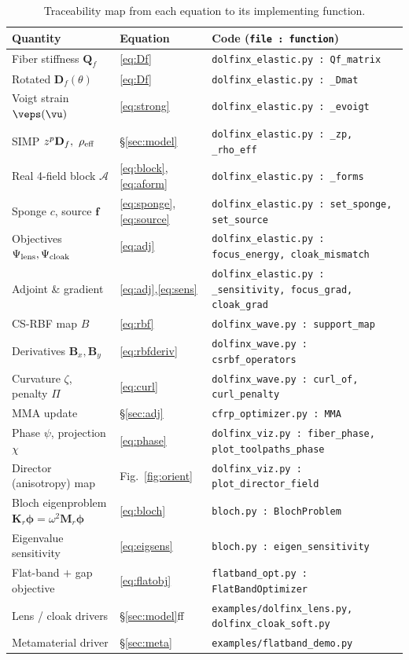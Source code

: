 \documentclass[11pt]{article}
\begin{document}
\begin{table}[h]
\centering
\small
\begin{tabular}{@{}lll@{}}
\toprule
Quantity & Equation & Code (\texttt{file : function}) \\
\midrule
Fiber stiffness $\mathbf Q_f$ & \eqref{eq:Df} & \texttt{dolfinx\_elastic.py : Qf\_matrix} \\
Rotated $\mathbf D_f(\theta)$ & \eqref{eq:Df} & \texttt{dolfinx\_elastic.py : \_Dmat} \\
Voigt strain $\veps(\vu)$ & \eqref{eq:strong} & \texttt{dolfinx\_elastic.py : \_evoigt} \\
SIMP $z^p\mathbf D_f,\ \rho_{\rm eff}$ & \S\ref{sec:model} & \texttt{dolfinx\_elastic.py : \_zp, \_rho\_eff} \\
Real 4-field block $\mathcal A$ & \eqref{eq:block},\eqref{eq:aform} & \texttt{dolfinx\_elastic.py : \_forms} \\
Sponge $c$, source $\mathbf f$ & \eqref{eq:sponge},\eqref{eq:source} & \texttt{dolfinx\_elastic.py : set\_sponge, set\_source} \\
Objectives $\Psi_{\rm lens},\Psi_{\rm cloak}$ & \eqref{eq:adj} & \texttt{dolfinx\_elastic.py : focus\_energy, cloak\_mismatch} \\
Adjoint \& gradient & \eqref{eq:adj},\eqref{eq:sens} & \texttt{dolfinx\_elastic.py : \_sensitivity, focus\_grad, cloak\_grad} \\
CS-RBF map $B$ & \eqref{eq:rbf} & \texttt{dolfinx\_wave.py : support\_map} \\
Derivatives $\mathbf B_x,\mathbf B_y$ & \eqref{eq:rbfderiv} & \texttt{dolfinx\_wave.py : csrbf\_operators} \\
Curvature $\zeta$, penalty $\Pi$ & \eqref{eq:curl} & \texttt{dolfinx\_wave.py : curl\_of, curl\_penalty} \\
MMA update & \S\ref{sec:adj} & \texttt{cfrp\_optimizer.py : MMA} \\
Phase $\psi$, projection $\chi$ & \eqref{eq:phase} & \texttt{dolfinx\_viz.py : fiber\_phase, plot\_toolpaths\_phase} \\
Director (anisotropy) map & Fig.~\ref{fig:orient} & \texttt{dolfinx\_viz.py : plot\_director\_field} \\
Bloch eigenproblem $\mathbf K_r\bm\phi=\omega^2\mathbf M_r\bm\phi$ & \eqref{eq:bloch} & \texttt{bloch.py : BlochProblem} \\
Eigenvalue sensitivity & \eqref{eq:eigsens} & \texttt{bloch.py : eigen\_sensitivity} \\
Flat-band $+$ gap objective & \eqref{eq:flatobj} & \texttt{flatband\_opt.py : FlatBandOptimizer} \\
Lens / cloak drivers & \S\ref{sec:model}ff & \texttt{examples/dolfinx\_lens.py, dolfinx\_cloak\_soft.py} \\
Metamaterial driver & \S\ref{sec:meta} & \texttt{examples/flatband\_demo.py} \\
\bottomrule
\end{tabular}
\caption{Traceability map from each equation to its implementing function.}
\label{tab:codemap}
\end{table}
\end{document}
